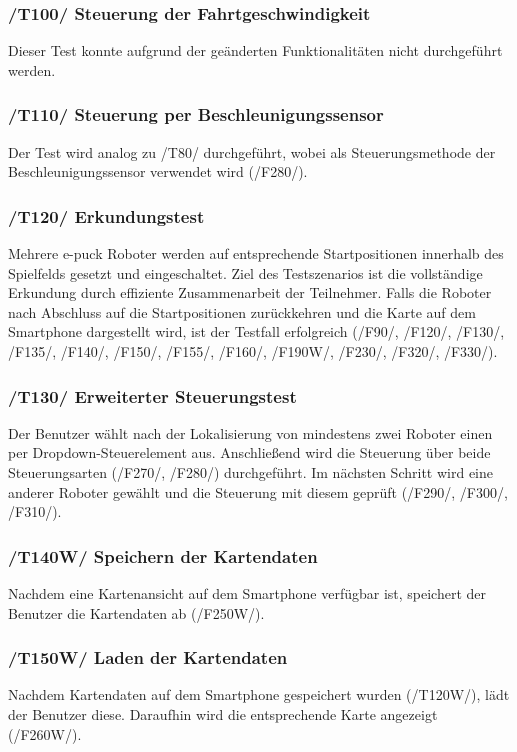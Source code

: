 \documentclass[10pt,a4paper]{article}
\begin{document}
			\subsubsection{/T100/ Steuerung der Fahrtgeschwindigkeit}
			Dieser Test konnte aufgrund der ge\"anderten Funktionalit\"aten nicht durchgef\"uhrt werden.
			
			\subsubsection{/T110/ Steuerung per Beschleunigungssensor}
			Der Test wird analog zu /T80/ durchgeführt, wobei als Steuerungsmethode der Beschleunigungssensor
			verwendet wird (/F280/).
			
			\subsubsection{/T120/ Erkundungstest}
			Mehrere e-puck Roboter werden auf entsprechende Startpositionen innerhalb des Spielfelds gesetzt und
			eingeschaltet. Ziel des Testszenarios ist die vollständige Erkundung durch effiziente Zusammenarbeit der Teilnehmer.
			Falls die Roboter nach Abschluss auf die Startpositionen zurückkehren und die Karte auf dem Smartphone dargestellt
			wird, ist der Testfall erfolgreich (/F90/, /F120/, /F130/, /F135/, /F140/,
			/F150/, /F155/, /F160/, /F190W/, /F230/, /F320/, /F330/).
			
			\subsubsection{/T130/ Erweiterter Steuerungstest}
			Der Benutzer wählt nach der Lokalisierung von mindestens zwei Roboter einen per Dropdown-Steuerelement aus.
			Anschließend wird die Steuerung über beide Steuerungsarten (/F270/, /F280/) durchgeführt. Im nächsten
			Schritt wird eine anderer Roboter gewählt und die Steuerung mit diesem geprüft (/F290/, /F300/, /F310/).
			
			\subsubsection{/T140W/ Speichern der Kartendaten}
			Nachdem eine Kartenansicht auf dem Smartphone verfügbar ist, speichert der Benutzer die Kartendaten ab (/F250W/).
			
			\subsubsection{/T150W/ Laden der Kartendaten}
			Nachdem Kartendaten auf dem Smartphone gespeichert wurden (/T120W/), lädt der Benutzer diese.
			Daraufhin wird die entsprechende Karte angezeigt (/F260W/).
			
\end{document}
